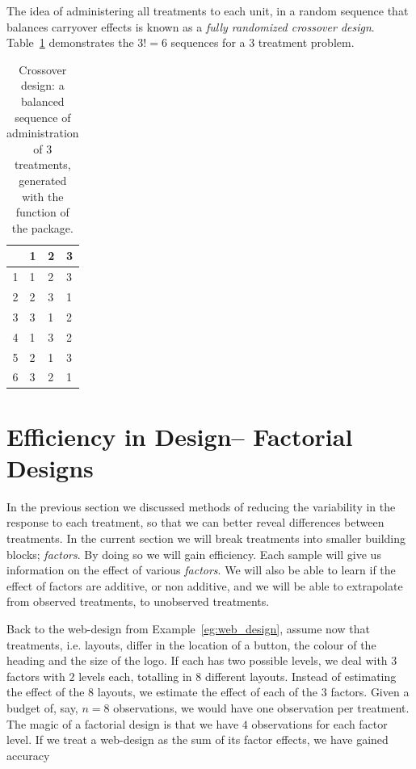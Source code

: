 The idea of administering all treatments to each unit, in a random sequence that balances carryover effects is known as a \emph{fully randomized crossover design}. 
Table~\ref{tab:crossover} demonstrates the $3!=6$ sequences for a $3$ treatment problem.
\begin{table}[ht]
\centering
\begin{tabular}{rlll}
  \hline
 & 1 & 2 & 3 \\ 
  \hline
1 & 1 & 2 & 3 \\ 
  2 & 2 & 3 & 1 \\ 
  3 & 3 & 1 & 2 \\ 
  4 & 1 & 3 & 2 \\ 
  5 & 2 & 1 & 3 \\ 
  6 & 3 & 2 & 1 \\ 
   \hline
\end{tabular}
\caption[Crossover Design]{Crossover design: a balanced sequence of administration of $3$ treatments, generated with the  function of the  \R package. }
\label{tab:crossover}
\end{table}









\section{Efficiency in Design-- Factorial Designs}
\label{sec:factorial_design}

In the previous section we discussed methods of reducing the variability in the response to each treatment, so that we can better reveal differences between treatments. 
In the current section we will break treatments into smaller building blocks; \emph{factors}.
By doing so we will gain efficiency. 
Each sample will give us information on the effect of various \emph{factors}.
We will also be able to learn if the effect of factors are additive, or non additive, and we will be able to extrapolate from observed treatments, to unobserved treatments. 


\begin{example}
\label{eg:web_design_II}
Back to the web-design from Example~\ref{eg:web_design}, assume now that treatments, i.e. layouts, differ in the location of a button, the colour of the heading and the size of the logo. 
If each has two possible levels, we deal with $3$ factors with $2$ levels each, totalling in $8$ different layouts. 
Instead of estimating the effect of the $8$ layouts, we estimate the effect of each of the $3$ factors. 
Given a budget of, say, $n=8$ observations, we would have one observation per treatment. 
The magic of a factorial design is that we have $4$ observations for each factor level.
If we treat a web-design as the sum of its factor effects, we have gained accuracy 
\end{example}


